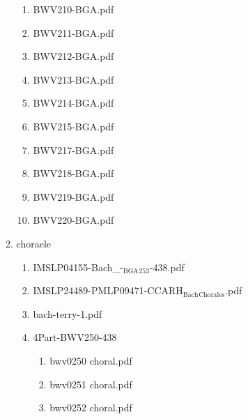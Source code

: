 \documentclass[11pt]{article}
\begin{document}
\begin{enumerate}
\begin{enumerate}
\begin{enumerate}
\item BWV210-BGA.pdf
\label{sec-1-1-1-1-44-6-7-1-242}

\item BWV211-BGA.pdf
\label{sec-1-1-1-1-44-6-7-1-243}

\item BWV212-BGA.pdf
\label{sec-1-1-1-1-44-6-7-1-244}

\item BWV213-BGA.pdf
\label{sec-1-1-1-1-44-6-7-1-245}

\item BWV214-BGA.pdf
\label{sec-1-1-1-1-44-6-7-1-246}

\item BWV215-BGA.pdf
\label{sec-1-1-1-1-44-6-7-1-247}

\item BWV217-BGA.pdf
\label{sec-1-1-1-1-44-6-7-1-248}

\item BWV218-BGA.pdf
\label{sec-1-1-1-1-44-6-7-1-249}

\item BWV219-BGA.pdf
\label{sec-1-1-1-1-44-6-7-1-250}

\item BWV220-BGA.pdf
\label{sec-1-1-1-1-44-6-7-1-251}
\end{enumerate}

\item choraele
\label{sec-1-1-1-1-44-6-7-2}
\begin{enumerate}
\item IMSLP04155-Bach\_-$_{\text{BGA}}$$_{\text{253}}$-438.pdf
\label{sec-1-1-1-1-44-6-7-2-1}

\item IMSLP24489-PMLP09471-CCARH$_{\text{Bach}}$$_{\text{Chorales}}$.pdf
\label{sec-1-1-1-1-44-6-7-2-2}

\item bach-terry-1.pdf
\label{sec-1-1-1-1-44-6-7-2-3}

\item 4Part-BWV250-438
\label{sec-1-1-1-1-44-6-7-2-4}
\begin{enumerate}
\item bwv0250 choral.pdf
\label{sec-1-1-1-1-44-6-7-2-4-1}

\item bwv0251 choral.pdf
\label{sec-1-1-1-1-44-6-7-2-4-2}

\item bwv0252 choral.pdf
\label{sec-1-1-1-1-44-6-7-2-4-3}


\end{enumerate}
\end{enumerate}
\end{enumerate}
\end{enumerate}
\end{document}
